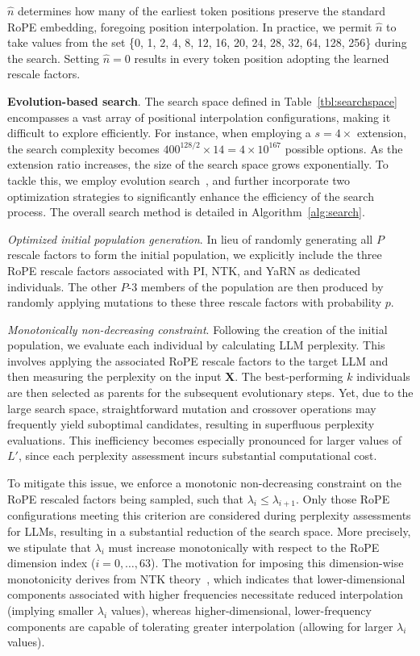 $\hat{n}$ determines how many of the earliest token positions preserve the standard RoPE embedding, foregoing position interpolation. In practice, we permit $\hat{n}$ to take values from the set \{0, 1, 2, 4, 8, 12, 16, 20, 24, 28, 32, 64, 128, 256\} during the search. Setting $\hat{n}=0$ results in every token position adopting the learned rescale factors.

\textbf{Evolution-based search}. The search space defined in Table~\ref{tbl:searchspace} encompasses a vast array of positional interpolation configurations, making it difficult to explore efficiently. For instance, when employing a $s=4\times$ extension, the search complexity becomes $400^{128/2}\times14=4\times10^{167}$ possible options. As the extension ratio increases, the size of the search space grows exponentially. To tackle this, we employ evolution search~\cite{guo2020single}, and further incorporate two optimization strategies to significantly enhance the efficiency of the search process. The overall search method is detailed in Algorithm~\ref{alg:search}.

\textit{Optimized initial population generation}. In lieu of randomly generating all $P$ rescale factors to form the initial population, we explicitly include the three RoPE rescale factors associated with PI, NTK, and YaRN as dedicated individuals. The other $P$-3 members of the population are then produced by randomly applying mutations to these three rescale factors with probability $p$.

\textit{Monotonically non-decreasing constraint}. Following the creation of the initial population, we evaluate each individual by calculating LLM perplexity. This involves applying the associated RoPE rescale factors to the target LLM and then measuring the perplexity on the input $\mathbf{X}$. The best-performing $k$ individuals are then selected as parents for the subsequent evolutionary steps. Yet, due to the large search space, straightforward mutation and crossover operations may frequently yield suboptimal candidates, resulting in superfluous perplexity evaluations. This inefficiency becomes especially pronounced for larger values of $L'$, since each perplexity assessment incurs substantial computational cost.

To mitigate this issue, we enforce a monotonic non-decreasing constraint on the RoPE rescaled factors being sampled, such that $\lambda_i \le \lambda_{i+1}$. Only those RoPE configurations meeting this criterion are considered during perplexity assessments for LLMs, resulting in a substantial reduction of the search space. More precisely, we stipulate that $\lambda_i$ must increase monotonically with respect to the RoPE dimension index ($i=0,\ldots,63$). The motivation for imposing this dimension-wise monotonicity derives from NTK theory~\cite{jacot2018neural,tancik2020fourier,ntk}, which indicates that lower-dimensional components associated with higher frequencies necessitate reduced interpolation (implying smaller $\lambda_i$ values), whereas higher-dimensional, lower-frequency components are capable of tolerating greater interpolation (allowing for larger $\lambda_i$ values).

